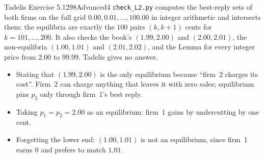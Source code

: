 \begin{exsol}{Tadelis Exercise 5.12}{98}{Advanced}{4}
\verify \texttt{check\_L2.py} computes the best-reply sets of both firms on the full grid $0.00, 0.01, \dots, 100.00$ in integer
arithmetic and intersects them: the equilibria are exactly the $100$ pairs $(k, k+1)$ cents for $k = 101, \dots, 200$.
It also checks the book's $(1.99, 2.00)$ and $(2.00, 2.01)$, the non-equilibria $(1.00, 1.01)$ and $(2.01, 2.02)$,
and the Lemma for every integer price from $2.00$ to $99.99$. Tadelis gives no answer.

\mistakes
\begin{itemize}
  \item Stating that $(1.99, 2.00)$ is the only equilibrium because ``firm~2 charges its cost''. Firm~2 can charge anything
  that leaves it with zero sales; equilibrium pins $p_2$ only through firm~1's best reply.
  \item Taking $p_1 = p_2 = 2.00$ as an equilibrium: firm~1 gains by undercutting by one cent.
  \item Forgetting the lower end: $(1.00, 1.01)$ is not an equilibrium, since firm~1 earns $0$ and prefers to match $1.01$.
\end{itemize}
\end{exsol}
